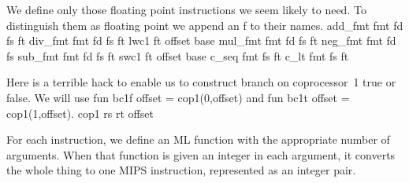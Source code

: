 \endcode
{}
We define only those floating point instructions we seem likely to need.
To distinguish them as floating point we append an f to their names.
\enddocs
{}
\endmoddef
add_fmt fmt fd fs ft
div_fmt fmt fd fs ft
lwc1 ft offset base
mul_fmt fmt fd fs ft
neg_fmt fmt fd fs
sub_fmt fmt fd fs ft
swc1 ft offset base
c_seq fmt fs ft
c_lt fmt fs ft
\endcode
{}

 Here is a terrible hack to enable us to construct branch on coprocessor~1
true or false.
We will use \code{}fun bc1f offset = cop1(0,offset)\edoc{} and
        \code{}fun bc1t offset = cop1(1,offset)\edoc{}.
\enddocs
{}
\endmoddef
cop1 rs rt offset
\endcode
{}



\enddocs
{}
For each instruction, we define an ML function with the appropriate
number of arguments.
When that function is given an integer in each argument,
it converts the whole thing to one MIPS instruction, represented as an
integer pair.


